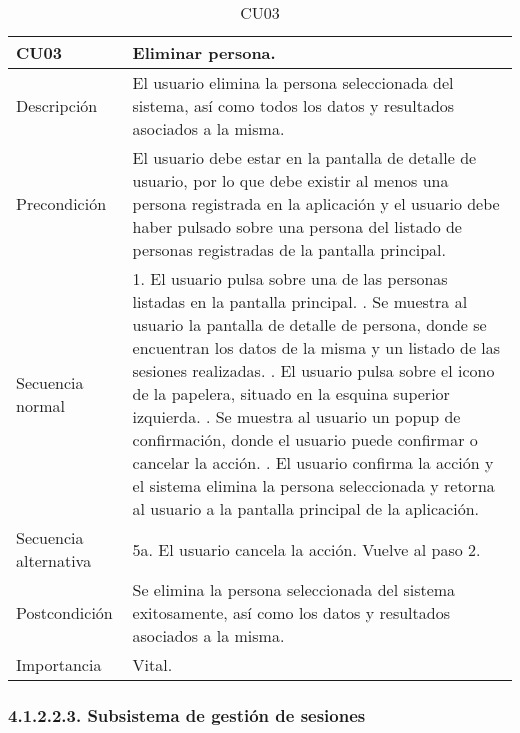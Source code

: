 \begin{table}[H]
\label{CU03}
\begin{center}
\begin{tabular}{| l | p{10cm} |}
\hline
CU03 & Eliminar persona.\\
\hline
Descripción & El usuario elimina la persona seleccionada del sistema, así como todos los datos y resultados asociados a la misma.\\
\hline
Precondición & El usuario debe estar en la pantalla de detalle de usuario, por lo que debe existir al menos una persona registrada en la aplicación y el usuario debe haber pulsado sobre una persona del listado de personas registradas de la pantalla principal.\\
\hline
Secuencia normal & 1. El usuario pulsa sobre una de las personas listadas en la pantalla principal.
\newline 2. Se muestra al usuario la pantalla de detalle de persona, donde se encuentran los datos de la misma y un listado de las sesiones realizadas.
\newline 3. El usuario pulsa sobre el icono de la papelera, situado en la esquina superior izquierda.
\newline 4. Se muestra al usuario un popup de confirmación, donde el usuario puede confirmar o cancelar la acción.
\newline 5. El usuario confirma la acción y el sistema elimina la persona seleccionada y retorna al usuario a la pantalla principal de la aplicación.\\
\hline
Secuencia alternativa & 5a. El usuario cancela la acción. Vuelve al paso 2.\\
\hline
Postcondición & Se elimina la persona seleccionada del sistema exitosamente, así como los datos y resultados asociados a la misma.\\
\hline
Importancia & Vital.\\
\hline
\end{tabular}
\end{center}
\caption{CU03}
\end{table} 

\subsubsection{4.1.2.2.3. Subsistema de gestión de sesiones}

